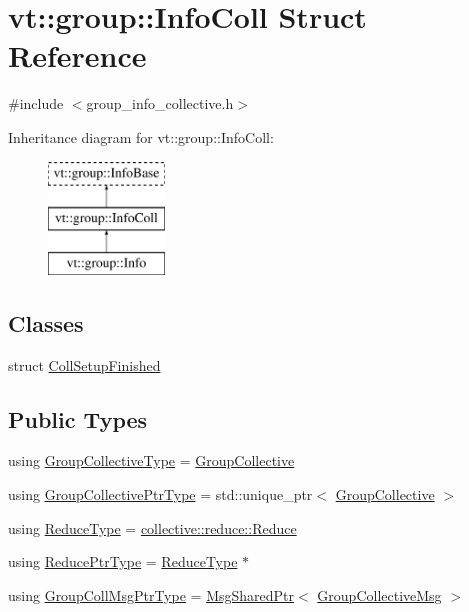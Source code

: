 \hypertarget{structvt_1_1group_1_1_info_coll}{}\section{vt\+:\+:group\+:\+:Info\+Coll Struct Reference}
\label{structvt_1_1group_1_1_info_coll}


{\ttfamily \#include $<$group\+\_\+info\+\_\+collective.\+h$>$}

Inheritance diagram for vt\+:\+:group\+:\+:Info\+Coll\+:\begin{figure}[H]
\begin{center}
\leavevmode
\includegraphics[height=3.000000cm]{structvt_1_1group_1_1_info_coll}
\end{center}
\end{figure}
\subsection*{Classes}
\begin{DoxyCompactItemize}
\item 
struct \hyperlink{structvt_1_1group_1_1_info_coll_1_1_coll_setup_finished}{Coll\+Setup\+Finished}
\end{DoxyCompactItemize}
\subsection*{Public Types}
\begin{DoxyCompactItemize}
\item 
using \hyperlink{structvt_1_1group_1_1_info_coll_a49957a600d853362ccc55f1ad9d1b173}{Group\+Collective\+Type} = \hyperlink{structvt_1_1group_1_1_group_collective}{Group\+Collective}
\item 
using \hyperlink{structvt_1_1group_1_1_info_coll_a96f3e779eb522034ee3db6c93b3f4c6b}{Group\+Collective\+Ptr\+Type} = std\+::unique\+\_\+ptr$<$ \hyperlink{structvt_1_1group_1_1_group_collective}{Group\+Collective} $>$
\item 
using \hyperlink{structvt_1_1group_1_1_info_coll_a8376e2576e5e40b3c8059122bc96ec1b}{Reduce\+Type} = \hyperlink{structvt_1_1collective_1_1reduce_1_1_reduce}{collective\+::reduce\+::\+Reduce}
\item 
using \hyperlink{structvt_1_1group_1_1_info_coll_a1b9fe0214f622ed9e8987531f44ef1fa}{Reduce\+Ptr\+Type} = \hyperlink{structvt_1_1group_1_1_info_coll_a8376e2576e5e40b3c8059122bc96ec1b}{Reduce\+Type} $\ast$
\item 
using \hyperlink{structvt_1_1group_1_1_info_coll_a1fcdc451e1e99aedebf302b234c529a6}{Group\+Coll\+Msg\+Ptr\+Type} = \hyperlink{namespacevt_ab2b3d506ec8e8d1540aede826d84a239}{Msg\+Shared\+Ptr}$<$ \hyperlink{namespacevt_1_1group_a4c1183efe0185992fefb3ab38a55a8a7}{Group\+Collective\+Msg} $>$
\end{DoxyCompactItemize}
